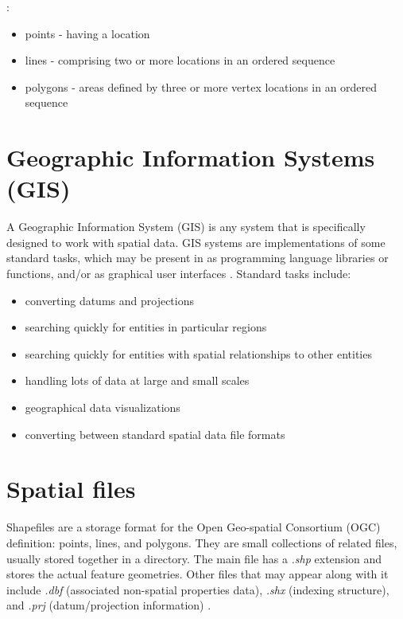  \cite{iso_simple_features}:

\begin{itemize}
	\item points - having a location
	\item lines - comprising two or more locations in an ordered sequence
	\item polygons - areas defined by three or more vertex locations in an ordered sequence
\end{itemize}

\section{Geographic Information Systems (GIS)}

A Geographic Information System (GIS) is any system that is specifically designed to work with spatial data. GIS systems are implementations of some standard tasks, which may be present in as programming language libraries or functions, and/or as graphical user interfaces \cite{fox_spatial_2018}. Standard tasks include:

\begin{itemize}
	\item converting datums and projections
	\item searching quickly for entities in particular regions
	\item searching quickly for entities with spatial relationships to other entities
	\item handling lots of data at large and small scales
	\item geographical data visualizations
	\item converting between standard spatial data file formats
\end{itemize}


\section{Spatial files}

Shapefiles are a storage format for the Open Geo-spatial Consortium (OGC) definition: points, lines, and polygons. They are small collections of related files, usually stored together in a directory. The main file has a \textit{.shp} extension and stores the actual feature geometries. Other files that may appear along with it include \textit{.dbf} (associated non-spatial properties data), \textit{.shx} (indexing structure), and \textit{.prj} (datum/projection information) \cite{fox_spatial_2018}.

